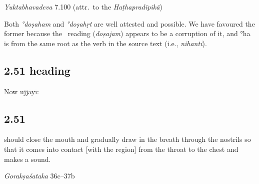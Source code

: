 \begin{ekdosis}
\begin{testimonia}[hp02_050]
\emph{Yuktabhavadeva} 7.100 (attr.~to the \emph{Haṭhapradīpikā})

\begin{versinnote}
\end{versinnote}

\end{testimonia}

\begin{philcomm}[hp02_050]

Both \emph{°doṣaham} and \emph{°doṣahṛt} are well attested and possible. We have favoured the former because the \textalpha\ reading (\emph{doṣajam}) appears to be a corruption of it, and °ha is from the same root as the verb in the source text (i.e., \textit{nihanti}).%
\end{philcomm}

\subsection*{2.51 heading}
\begin{translation}[hp02_051a]
Now ujjāyī:
\end{translation}


\subsection*{2.51}
\begin{translation} should close the mouth and gradually draw in the breath through the nostrils so that it comes into contact [with the region] from the throat to the chest and makes a sound.
\end{translation}

\begin{sources}[hp02_051]
\emph{Gorakṣaśataka} 36c–37b


\end{sources}
\end{ekdosis}
